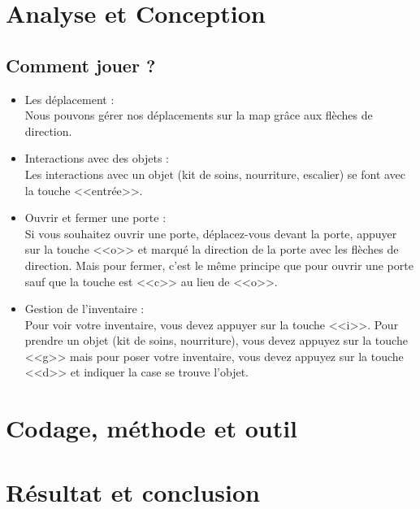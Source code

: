 \documentclass[12pt]{report}
\begin{document}
\chapter{Analyse et Conception}
	\section{Comment jouer ?}
		\begin{itemize}
			\item{Les déplacement : \\}
				Nous pouvons gérer nos déplacements sur la map grâce aux flèches de direction. 
			\item{Interactions avec des objets : \\}	
				Les interactions avec un objet (kit de soins, nourriture, escalier) se font avec la touche <<entrée>>.
			\item{Ouvrir et fermer une porte :\\}	
				Si vous souhaitez ouvrir une porte, déplacez-vous devant la porte, appuyer sur la touche <<o>> et marqué la direction de la porte avec les flèches de direction.
				Mais pour fermer, c'est le même principe que pour ouvrir une porte sauf que la touche est <<c>> au lieu de <<o>>.
			\item{Gestion de l'inventaire : \\}
				Pour voir votre inventaire, vous devez appuyer sur la touche <<i>>. Pour prendre un objet (kit de soins, nourriture), vous devez appuyez sur la touche <<g>> mais pour poser votre inventaire, vous devez appuyez sur la touche <<d>> et indiquer la case se trouve l'objet.
		\end{itemize}
		
		
\chapter{Codage, méthode et outil}

\chapter{Résultat et conclusion}
\end{document}
